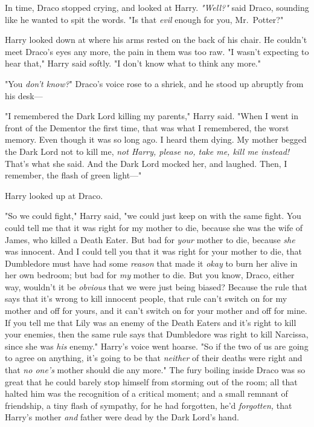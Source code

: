 In time, Draco stopped crying, and looked at Harry. \emph{"Well?"} said Draco,
sounding like he wanted to spit the words. "Is that \emph{evil} enough for you,
Mr.~Potter?"

Harry looked down at where his arms rested on the back of his chair. He
couldn't meet Draco's eyes any more, the pain in them was too raw. "I wasn't
expecting to hear that," Harry said softly. "I don't know what to think any
more."

"You \emph{don't know?}" Draco's voice rose to a shriek, and he stood up
abruptly from his desk---

"I remembered the Dark Lord killing my parents," Harry said. "When I went in
front of the Dementor the first time, that was what I remembered, the worst
memory. Even though it was so long ago. I heard them dying. My mother begged
the Dark Lord not to kill me, \emph{not Harry, please no, take me, kill me
instead!} That's what she said. And the Dark Lord mocked her, and laughed.
Then, I remember, the flash of green light\mbox{---}"

Harry looked up at Draco.

"So we could fight," Harry said, "we could just keep on with the same fight.
You could tell me that it was right for my mother to die, because she was the
wife of James, who killed a Death Eater. But bad for \emph{your} mother to die,
because \emph{she} was innocent. And I could tell you that it was right for
your mother to die, that Dumbledore must have had some \emph{reason} that made
it \emph{okay} to burn her alive in her own bedroom; but bad for \emph{my}
mother to die. But you know, Draco, either way, wouldn't it be \emph{obvious}
that we were just being biased? Because the rule that says that it's wrong to
kill innocent people, that rule can't switch on for my mother and off for
yours, and it can't switch on for your mother and off for mine. If you tell me
that Lily was an enemy of the Death Eaters and it's right to kill your enemies,
then the same rule says that Dumbledore was right to kill Narcissa, since she
was \emph{his} enemy." Harry's voice went hoarse. "So if the two of us are
going to agree on anything, it's going to be that \emph{neither} of their
deaths were right and that \emph{no one's} mother should die any more."
\sbreak
The fury boiling inside Draco was so great that he could barely stop himself
from storming out of the room; all that halted him was the recognition of a
critical moment; and a small remnant of friendship, a tiny flash of sympathy,
for he had forgotten, he'd \emph{forgotten,} that Harry's mother \emph{and}
father were dead by the Dark Lord's hand.

